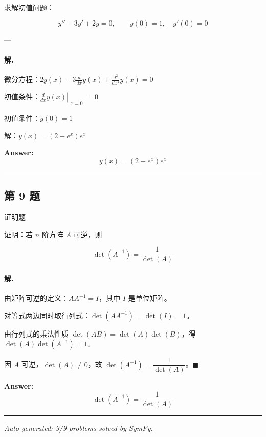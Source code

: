 \documentclass[12pt, a4paper]{ctexart}
\newcommand{\problem}[1]{\subsection*{第 #1 题}}
\newcommand{\solution}{\paragraph{解.}}
\begin{document}
求解初值问题：

$$
y'' - 3y' + 2y = 0, \qquad y(0) = 1, \quad y'(0) = 0
$$

---

\solution

微分方程：$2 y{\left(x \right)} - 3 \frac{d}{d x} y{\left(x \right)} + \frac{d^{2}}{d x^{2}} y{\left(x \right)} = 0$

初值条件：$\left. \frac{d}{d x} y{\left(x \right)} \right|_{\substack{ x=0 }} = 0$

初值条件：$y{\left(0 \right)} = 1$

解：$y(x) = \left(2 - e^{x}\right) e^{x}$

\textbf{Answer:}
\[\boxed{y(x) = \left(2 - e^{x}\right) e^{x}}\]

\vspace{1em}
\hrule
\vspace{1em}

\problem{9}

证明题

证明：若 $n$ 阶方阵 $A$ 可逆，则

$$
\det(A^{-1}) = \frac{1}{\det(A)}
$$

\solution

由矩阵可逆的定义：$AA^{-1} = I$，其中 $I$ 是单位矩阵。

对等式两边同时取行列式：$\det(AA^{-1}) = \det(I) = 1$。

由行列式的乘法性质 $\det(AB) = \det(A)\det(B)$，得 $\det(A)\det(A^{-1}) = 1$。

因 $A$ 可逆，$\det(A) \neq 0$，故 $\det(A^{-1}) = \dfrac{1}{\det(A)}$。$\blacksquare$

\textbf{Answer:}
\[\boxed{\det(A^{-1}) = \frac{1}{\det(A)}}\]

\vspace{1em}
\hrule
\vspace{1em}


\vspace{2em}
\noindent\textit{Auto-generated: 9/9 problems solved by SymPy.}
\end{document}
